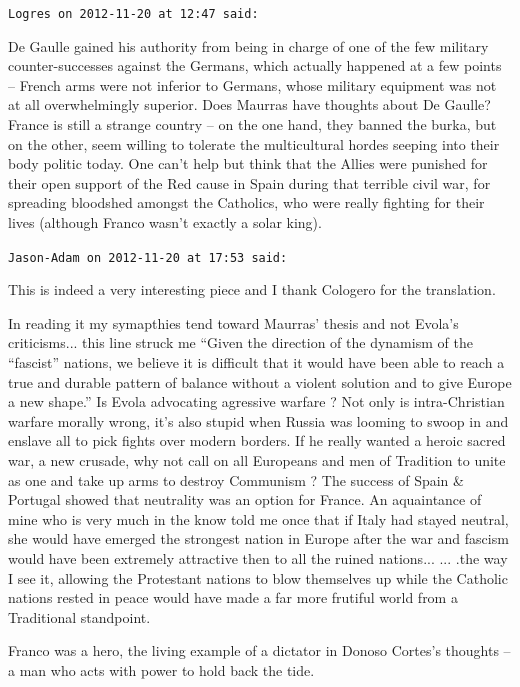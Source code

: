 \begin{footnotesize}
\begin{sffamily}
\texttt{Logres on 2012-11-20 at 12:47 said:}

De Gaulle gained his authority from being in charge of one of the few military counter-successes against the Germans, which actually happened at a few points -- French arms were not inferior to Germans, whose military equipment was not at all overwhelmingly superior. Does Maurras have thoughts about De Gaulle? France is still a strange country -- on the one hand, they banned the burka, but on the other, seem willing to tolerate the multicultural hordes seeping into their body politic today. One can't help but think that the Allies were punished for their open support of the Red cause in Spain during that terrible civil war, for spreading bloodshed amongst the Catholics, who were really fighting for their lives (although Franco wasn't exactly a solar king).

\hfill

\texttt{Jason-Adam on 2012-11-20 at 17:53 said:}

This is indeed a very interesting piece and I thank Cologero for the translation.

In reading it my symapthies tend toward Maurras' thesis and not Evola's criticisms... this line struck me ``Given the direction of the dynamism of the ``fascist'' nations, we believe it is difficult that it would have been able to reach a true and durable pattern of balance without a violent solution and to give Europe a new shape.'' Is Evola advocating agressive warfare ? Not only is intra-Christian warfare morally wrong, it's also stupid when Russia was looming to swoop in and enslave all to pick fights over modern borders. If he really wanted a heroic sacred war, a new crusade, why not call on all Europeans and men of Tradition to unite as one and take up arms to destroy Communism ? The success of Spain \& Portugal showed that neutrality was an option for France. An aquaintance of mine who is very much in the know told me once that if Italy had stayed neutral, she would have emerged the strongest nation in Europe after the war and fascism would have been extremely attractive then to all the ruined nations... ... .the way I see it, allowing the Protestant nations to blow themselves up while the Catholic nations rested in peace would have made a far more frutiful world from a Traditional standpoint.

Franco was a hero, the living example of a dictator in Donoso Cortes's thoughts -- a man who acts with power to hold back the tide.


\end{sffamily}
\end{footnotesize}
